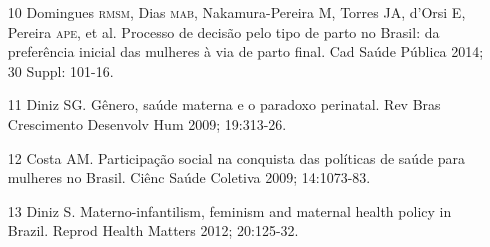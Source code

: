 \documentclass{article}
\begin{document}
\begin{itemize}
\item[10] Domingues \textsc{rmsm}, Dias \textsc{mab}, Nakamura-Pereira M, Torres JA, d’Orsi E,
Pereira \textsc{ape}, et al. Processo de decisão pelo tipo de parto no Brasil: da
preferência inicial das mulheres à via de parto final. Cad Saúde Pública 2014;
30 Suppl: 101-16.

\item[11] Diniz SG. Gênero, saúde materna e o paradoxo perinatal. Rev Bras
Crescimento Desenvolv Hum 2009; 19:313-26.

\item[12] Costa AM. Participação social na conquista das políticas de saúde
para mulheres no Brasil. Ciênc Saúde Coletiva 2009; 14:1073-83.

\item[13] Diniz S. Materno-infantilism, feminism and maternal health policy
in Brazil. Reprod Health Matters 2012; 20:125-32.

\end{itemize}
\end{document}
